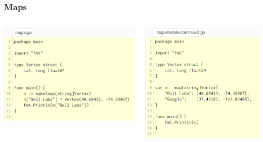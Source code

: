 \documentclass[14pt]{beamer}
\begin{document}
{
\begin{frame}
    \frametitle{Maps}
    \begin{columns}
        \begin{column}{0.55\textwidth}
            \includegraphics[width=\linewidth]{img/maps.PNG}
        \end{column}
        \begin{column}{0.45\textwidth}
            \includegraphics[width=\linewidth]{img/mapliterals.PNG}
        \end{column}
    \end{columns}
\end{frame}
}
\end{document}
